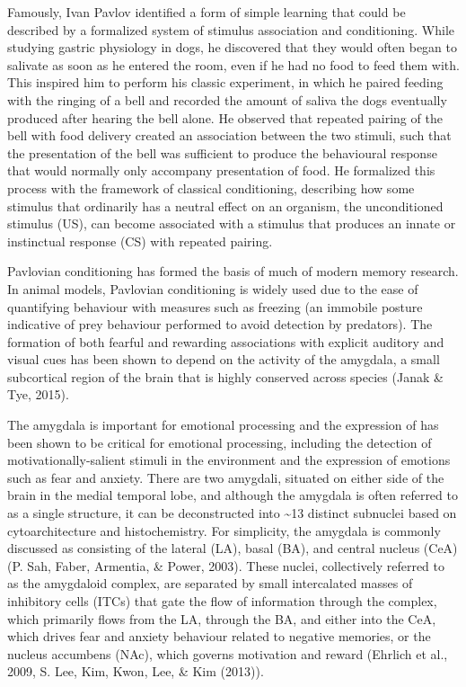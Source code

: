 \documentclass[12pt,a4paper,]{report}
\begin{document}
Famously, Ivan Pavlov identified a form of simple learning that could be
described by a formalized system of stimulus association and
conditioning. While studying gastric physiology in dogs, he discovered
that they would often began to salivate as soon as he entered the room,
even if he had no food to feed them with. This inspired him to perform
his classic experiment, in which he paired feeding with the ringing of a
bell and recorded the amount of saliva the dogs eventually produced
after hearing the bell alone. He observed that repeated pairing of the
bell with food delivery created an association between the two stimuli,
such that the presentation of the bell was sufficient to produce the
behavioural response that would normally only accompany presentation of
food. He formalized this process with the framework of classical
conditioning, describing how some stimulus that ordinarily has a neutral
effect on an organism, the unconditioned stimulus (US), can become
associated with a stimulus that produces an innate or instinctual
response (CS) with repeated pairing.

Pavlovian conditioning has formed the basis of much of modern memory
research. In animal models, Pavlovian conditioning is widely used due to
the ease of quantifying behaviour with measures such as freezing (an
immobile posture indicative of prey behaviour performed to avoid
detection by predators). The formation of both fearful and rewarding
associations with explicit auditory and visual cues has been shown to
depend on the activity of the amygdala, a small subcortical region of
the brain that is highly conserved across species (Janak \& Tye, 2015).

The amygdala is important for emotional processing and the expression of
has been shown to be critical for emotional processing, including the
detection of motivationally-salient stimuli in the environment and the
expression of emotions such as fear and anxiety. There are two amygdali,
situated on either side of the brain in the medial temporal lobe, and
although the amygdala is often referred to as a single structure, it can
be deconstructed into \textasciitilde{}13 distinct subnuclei based on
cytoarchitecture and histochemistry. For simplicity, the amygdala is
commonly discussed as consisting of the lateral (LA), basal (BA), and
central nucleus (CeA) (P. Sah, Faber, Armentia, \& Power, 2003). These
nuclei, collectively referred to as the amygdaloid complex, are
separated by small intercalated masses of inhibitory cells (ITCs) that
gate the flow of information through the complex, which primarily flows
from the LA, through the BA, and either into the CeA, which drives fear
and anxiety behaviour related to negative memories, or the nucleus
accumbens (NAc), which governs motivation and reward (Ehrlich et al.,
2009, S. Lee, Kim, Kwon, Lee, \& Kim (2013)).
\end{document}
